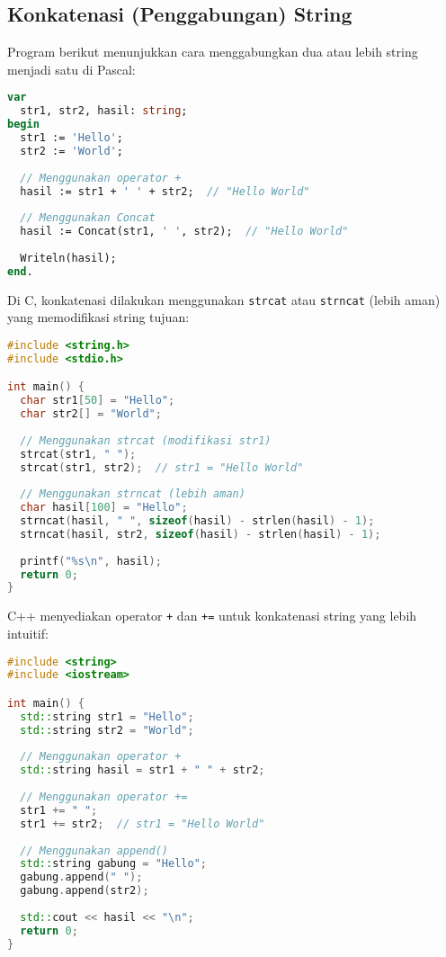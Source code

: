 \documentclass[../main.tex]{subfiles}
\begin{document}
\subsection{Konkatenasi (Penggabungan) String}

Program berikut menunjukkan cara menggabungkan dua atau lebih string menjadi satu di Pascal:

\begin{lstlisting}[language=Pascal, caption={Konkatenasi di Pascal}]
var
  str1, str2, hasil: string;
begin
  str1 := 'Hello';
  str2 := 'World';
  
  // Menggunakan operator +
  hasil := str1 + ' ' + str2;  // "Hello World"
  
  // Menggunakan Concat
  hasil := Concat(str1, ' ', str2);  // "Hello World"
  
  Writeln(hasil);
end.
\end{lstlisting}

Di C, konkatenasi dilakukan menggunakan \texttt{strcat} atau \texttt{strncat} (lebih aman) yang memodifikasi string tujuan:

\begin{lstlisting}[language=C, caption={Konkatenasi di C}]
#include <string.h>
#include <stdio.h>

int main() {
  char str1[50] = "Hello";
  char str2[] = "World";
  
  // Menggunakan strcat (modifikasi str1)
  strcat(str1, " ");
  strcat(str1, str2);  // str1 = "Hello World"
  
  // Menggunakan strncat (lebih aman)
  char hasil[100] = "Hello";
  strncat(hasil, " ", sizeof(hasil) - strlen(hasil) - 1);
  strncat(hasil, str2, sizeof(hasil) - strlen(hasil) - 1);
  
  printf("%s\n", hasil);
  return 0;
}
\end{lstlisting}

C++ menyediakan operator \texttt{+} dan \texttt{+=} untuk konkatenasi string yang lebih intuitif:

\begin{lstlisting}[language=C++, caption={Konkatenasi di C++}]
#include <string>
#include <iostream>

int main() {
  std::string str1 = "Hello";
  std::string str2 = "World";
  
  // Menggunakan operator +
  std::string hasil = str1 + " " + str2;
  
  // Menggunakan operator +=
  str1 += " ";
  str1 += str2;  // str1 = "Hello World"
  
  // Menggunakan append()
  std::string gabung = "Hello";
  gabung.append(" ");
  gabung.append(str2);
  
  std::cout << hasil << "\n";
  return 0;
}
\end{lstlisting}
\end{document}
